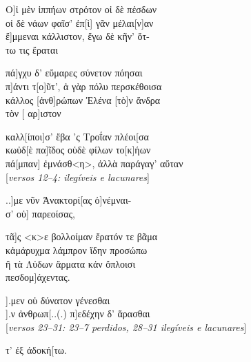 \begin{gkverse}
Ο]ἰ μὲν ἰππήων στρότον οἰ δὲ πέσδων\\
οἰ δὲ νάων φαῖσ’ ἐπ[ὶ] γᾶν μέλαι[ν]αν\\
ἔ]μμεναι κάλλιστον, ἔγω δὲ κῆν’ ὄτ-\\
τω τις ἔραται

πά]γχυ δ’ εὔμαρες σύνετον πόησαι\\
π]άντι τ[ο]ῦτ’, ἀ γὰρ πόλυ περσκέθοισα\\
κάλλος [ἀνθ]ρώπων Ἐλένα [τὸ]ν ἄνδρα\\
τὸν [    αρ]ιστον

καλλ[ίποι]σ’ ἔβα ’ς Τροΐαν πλέοι[σα\\
κωὐδ[ὲ πα]ῖδος οὐδὲ φίλων το[κ]ήων\\
πά[μπαν] ἐμνάσθ<η>, ἀλλὰ παράγαγ’ αὔταν\\

\textnormal{[\emph{versos 12--4: ilegíveis e lacunares}]}

..]με νῦν Ἀνακτορί[ας ὀ]νέμναι-\\
σ’ οὐ] παρεοίσας,

τᾶ]ς <κ>ε βολλοίμαν ἔρατόν τε βᾶμα\\
κἀμάρυχμα λάμπρον ἴδην προσώπω\\
ἢ τὰ Λύδων ἄρματα κἀν ὄπλοισι\\
πεσδομ]άχεντας.

			   ].μεν οὑ δύνατον γένεσθαι\\
		   ].ν ἀνθρωπ[..(.) π]εδέχην δ’ ἅρασθαι\\

\textnormal{[\emph{versos 23--31: 23--7 perdidos, 28--31 ilegíveis e lacunares}]}


     τ’ ἐξ ἀδοκή[τω.
\end{gkverse}


